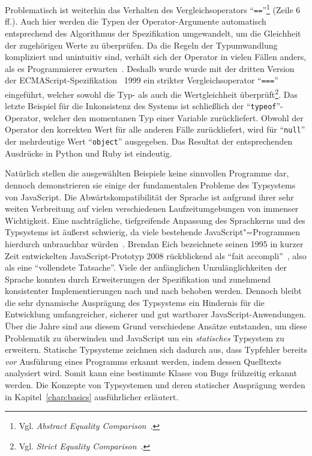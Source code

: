 \bigbreak


Problematisch ist weiterhin das Verhalten des Vergleichsoperators \enquote{\texttt{==}}\footnote{Vgl. \textit{Abstract Equality Comparison}~\autocite[Abschnitt 7.2.14]{ECMASCRIPT:2019}.} (Zeile 6 ff.). Auch hier werden die Typen der Operator-Argumente automatisch entsprechend des Algorithmus der Spezifikation umgewandelt, um die Gleichheit der zugehörigen Werte zu überprüfen. Da die Regeln der Typumwandlung kompliziert und unintuitiv sind, verhält sich der Operator in vielen Fällen anders, als es Programmierer erwarten~\autocite{PRADEL:2015}. Deshalb wurde wurde mit der dritten Version der ECMAScript-Spezifikation~\autocite{ECMASCRIPT:1999} 1999 ein strikter Vergleichsoperator \enquote{\texttt{===}} eingeführt, welcher sowohl die Typ- als auch die Wertgleichheit überprüft\footnote{Vgl. \textit{Strict Equality Comparison}~\autocite[Abschnitt 7.2.15]{ECMASCRIPT:2019}.}.
Das letzte Beispiel für die Inkonsistenz des Systems ist schließlich der \enquote{\texttt{typeof}}-Operator, welcher den momentanen Typ einer Variable zurückliefert. Obwohl der Operator den korrekten Wert für alle anderen Fälle zurückliefert, wird für \enquote{\texttt{null}} der mehrdeutige Wert \enquote{\texttt{object}} ausgegeben. Das Resultat der entsprechenden Ausdrücke in Python und Ruby ist eindeutig.

Natürlich stellen die ausgewählten Beispiele keine sinnvollen Programme dar, dennoch demonstrieren sie einige der fundamentalen Probleme des Typsystems von JavaScript. Die Abwärtskompatibilität der Sprache ist aufgrund ihrer sehr weiten Verbreitung auf vielen verschiedenen Laufzeitumgebungen von immenser Wichtigkeit. Eine nachträgliche, tiefgreifende Anpassung des Sprachkerns und des Typsystems ist äußerst schwierig, da viele bestehende JavaScript"=Programmen hierdurch unbrauchbar würden~\autocite[1]{CROCKFORD:JS_GOOD_PARTS}. Brendan Eich bezeichnete seinen 1995 in kurzer Zeit entwickelten JavaScript-Prototyp 2008 rückblickend als \enquote{fait accompli}~\autocite{EICH:POPULARITY}, also als eine \enquote{vollendete Tatsache}. Viele der anfänglichen Unzulänglichkeiten der Sprache konnten durch Erweiterungen der Spezifikation und zunehmend konsistenter Implementierungen nach und nach behoben werden. Dennoch bleibt die sehr dynamische Ausprägung des Typsystems ein Hindernis für die Entwicklung umfangreicher, sicherer und gut wartbarer JavaScript-Anwendungen. Über die Jahre sind aus diesem Grund verschiedene Ansätze entstanden, um diese Problematik zu überwinden und JavaScript um ein \emph{statisches} Typsystem zu erweitern. Statische Typsysteme zeichnen sich dadurch aus, dass Typfehler bereits \emph{vor} Ausführung eines Programms erkannt werden, indem dessen Quelltexts analysiert wird. Somit kann eine bestimmte Klasse von Bugs frühzeitig erkannt werden. Die Konzepte von Typsystemen und deren statischer Ausprägung werden in Kapitel~\ref{chap:basics} ausführlicher erläutert.


